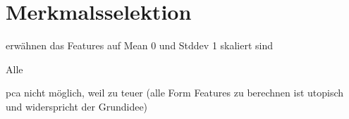 \section{Merkmalsselektion}
\label{merkmalsselektion}

erwähnen das Features auf Mean 0 und Stddev 1 skaliert sind

Alle

pca nicht möglich, weil zu teuer (alle Form Features zu berechnen ist utopisch und widerspricht der Grundidee)
